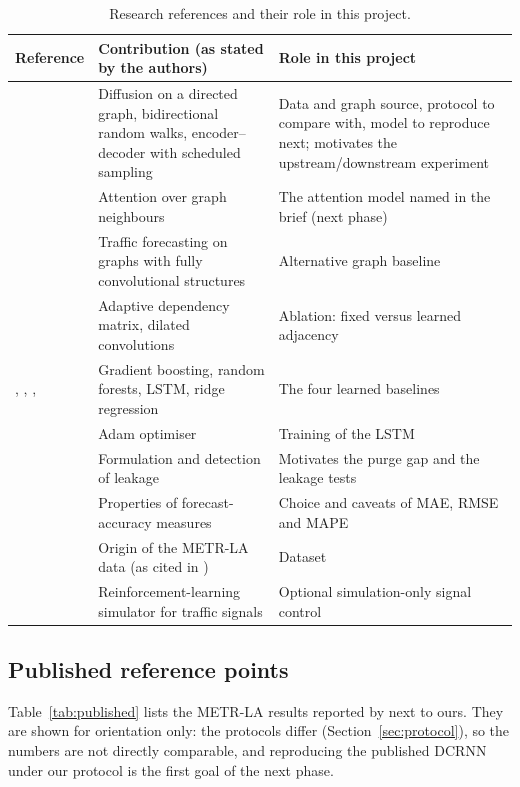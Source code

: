 \documentclass[11pt,a4paper]{article}
\begin{document}
\begin{table}[ht]
\centering\small
\begin{tabularx}{\textwidth}{@{}p{3.1cm}Xp{4.6cm}@{}}
\toprule
Reference & Contribution (as stated by the authors) & Role in this project \\
\midrule
\citet{li2018dcrnn} & Diffusion on a directed graph, bidirectional random walks, encoder--decoder with scheduled sampling & Data and graph source, protocol to compare with, model to reproduce next; motivates the upstream/downstream experiment \\
\citet{velickovic2018gat} & Attention over graph neighbours & The attention model named in the brief (next phase) \\
\citet{yu2018stgcn} & Traffic forecasting on graphs with fully convolutional structures & Alternative graph baseline \\
\citet{wu2019graphwavenet} & Adaptive dependency matrix, dilated convolutions & Ablation: fixed versus learned adjacency \\
\citet{chen2016xgboost}, \citet{breiman2001rf}, \citet{hochreiter1997lstm}, \citet{hoerl1970ridge} & Gradient boosting, random forests, LSTM, ridge regression & The four learned baselines \\
\citet{kingma2015adam} & Adam optimiser & Training of the LSTM \\
\citet{kaufman2012leakage} & Formulation and detection of leakage & Motivates the purge gap and the leakage tests \\
\citet{hyndman2006measures} & Properties of forecast-accuracy measures & Choice and caveats of MAE, RMSE and MAPE \\
\citet{jagadish2014bigdata} & Origin of the METR-LA data (as cited in \citealp{li2018dcrnn}) & Dataset \\
\citet{zhang2019cityflow} & Reinforcement-learning simulator for traffic signals & Optional simulation-only signal control \\
\bottomrule
\end{tabularx}
\caption{Research references and their role in this project.}
\label{tab:litmap}
\end{table}

\subsection{Published reference points}
Table~\ref{tab:published} lists the METR-LA results reported by \citet{li2018dcrnn} next to ours.
They are shown for orientation only: the protocols differ (Section~\ref{sec:protocol}), so the numbers are not directly comparable, and reproducing the published DCRNN under our protocol is the first goal of the next phase.
\begin{table}[ht]
\centering\small

\caption{METR-LA mean absolute error (mph) at 15, 30 and 60 minutes as reported by \citet{li2018dcrnn} (Table~1 of that paper), and ours on the strict test block. Protocols differ; see the text.}
\label{tab:published}
\end{table}
\end{document}
